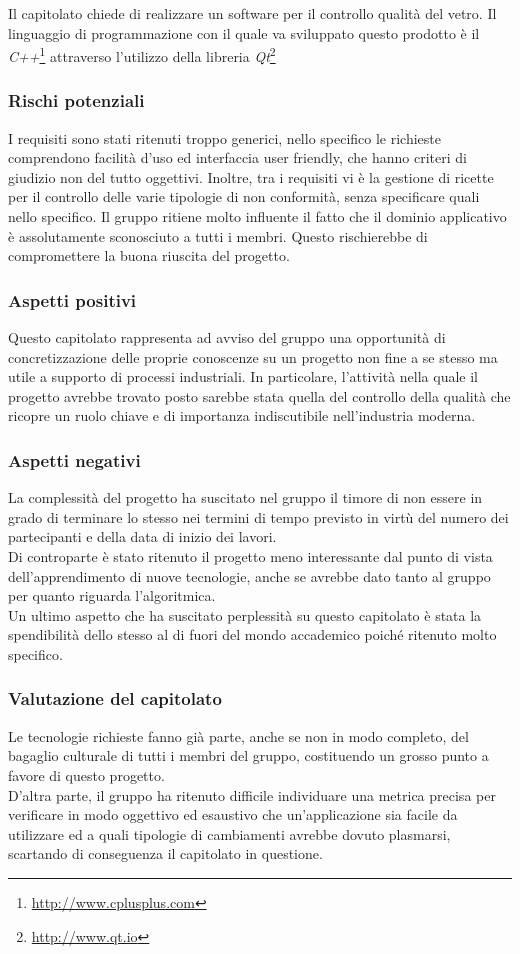 Il capitolato chiede di realizzare un software per il controllo qualità del vetro. Il linguaggio di programmazione con il quale va sviluppato questo prodotto è il \textit{C++}\footnote{\url{http://www.cplusplus.com}} attraverso l'utilizzo della libreria \textit{Qt}\footnote{\url{http://www.qt.io}}
\subsubsection{Rischi potenziali}
I requisiti sono stati ritenuti troppo generici, nello specifico le richieste comprendono facilità d'uso ed interfaccia user friendly, che hanno criteri di giudizio non del tutto oggettivi.
Inoltre, tra i requisiti vi è la gestione di ricette per il controllo delle varie tipologie di non conformità, senza specificare quali nello specifico.
Il gruppo \GRUPPO{} ritiene molto influente il fatto che il dominio applicativo è assolutamente sconosciuto a tutti i membri. Questo rischierebbe di compromettere la buona riuscita del progetto.
\subsubsection{Aspetti positivi}
Questo capitolato rappresenta ad avviso del gruppo una opportunità di concretizzazione delle proprie conoscenze su un progetto non fine a se stesso ma utile a supporto di processi industriali. In particolare, l’attività nella quale il progetto avrebbe trovato posto sarebbe stata quella del controllo della qualità che ricopre un ruolo chiave e di importanza indiscutibile nell'industria moderna.
\subsubsection{Aspetti negativi}
La complessità del progetto ha suscitato nel gruppo il timore di non essere in grado di terminare lo stesso nei termini di tempo previsto in virtù del numero dei partecipanti e della data di inizio dei lavori. \\
Di controparte è stato ritenuto il progetto meno interessante dal punto di vista dell’apprendimento di nuove tecnologie, anche se avrebbe dato tanto al gruppo per quanto riguarda l’algoritmica.\\
Un ultimo aspetto che ha suscitato perplessità su questo capitolato è stata la spendibilità dello stesso al di fuori del mondo accademico poiché ritenuto molto specifico.
\subsubsection{Valutazione del capitolato}
Le tecnologie richieste fanno già parte, anche se non in modo completo, del bagaglio culturale di tutti i membri del gruppo, costituendo un grosso punto a favore di questo progetto. \\
D’altra parte, il gruppo ha ritenuto difficile individuare una metrica precisa per verificare in modo oggettivo ed esaustivo che un’applicazione sia facile da utilizzare ed a quali tipologie di cambiamenti avrebbe dovuto plasmarsi, scartando di conseguenza il capitolato in questione.
